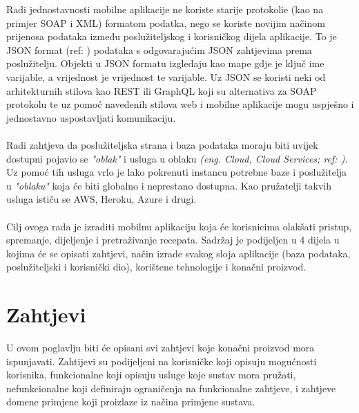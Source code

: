 \documentclass[times, utf8, zavrsni]{fer}
\begin{document}
Radi jednostavnosti mobilne aplikacije ne koriste starije protokolie (kao na primjer
SOAP i XML) formatom podatka, nego se koriste novijim načinom prijenosa
podataka između poslužiteljskog i korisničkog dijela aplikacije.
To je JSON format (ref: \cite{json}) podataka s odgovarajućim JSON zahtjevima prema poslužitelju.
Objekti u JSON formatu izgledaju kao mape gdje je ključ ime varijable, a vrijednost je
vrijednost te varijable.
Uz JSON se koristi neki od arhitekturnih stilova kao REST ili GraphQL koji su alternativa
za SOAP protokolu te uz pomoć navedenih stilova web i mobilne aplikacije mogu uspješno i jednostavno uspostavljati komunikaciju.
\\\\
Radi zahtjeva da poslužiteljska strana i baza podataka moraju biti uvijek dostupni
pojavio se \textit{"oblak"} i usluga u oblaku \textit{(eng. Cloud, Cloud Services; ref: \cite{CloudServices})}.
Uz pomoć tih usluga vrlo je lako pokrenuti instancu potrebne baze i poslužitelja
u \textit{"oblaku"} koja će biti globalno i neprestano dostupna. Kao pružatelji takvih usluga ističu se
AWS, Heroku, Azure i drugi.
\\\\
Cilj ovoga rada je izraditi mobilnu aplikaciju koja će korisnicima olakšati pristup,
spremanje, dijeljenje i pretraživanje recepata. Sadržaj je podijeljen u 4 dijela u kojima
će se opisati zahtjevi, način izrade svakog sloja aplikacije (baza podataka,
poslužiteljski i korisnički dio), korištene tehnologije i konačni proizvod.

\chapter{Zahtjevi}
U ovom poglavlju biti će opisani svi zahtjevi koje konačni proizvod
mora ispunjavati. Zahtijevi su podijeljeni na korisničke koji opisuju mogućnosti
korisnika, funkcionalne koji opisuju usluge koje sustav mora pružati, nefunkcionalne koji
definiraju ograničenja na funkcionalne zahtjeve,
i zahtjeve domene primjene koji proizlaze iz načina primjene sustava.
\end{document}
